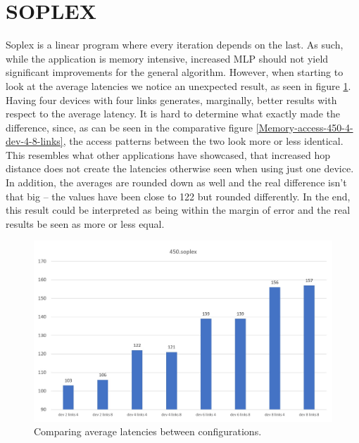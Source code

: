 \section{SOPLEX}
Soplex is a linear program where every iteration depends on the last. As such, while the application is memory intensive, increased MLP should not yield significant improvements for the general algorithm. However, when starting to look at the average latencies we notice an unexpected result, as seen in figure \ref{Memory-access-450-average-latency}. Having four devices with four links generates, marginally, better results with respect to the average latency. It is hard to determine what exactly made the difference, since, as can be seen in the comparative figure \ref{Memory-access-450-4-dev-4-8-links}, the access patterns between the two look more or less identical. This resembles what other applications have showcased, that increased hop distance does not create the latencies otherwise seen when using just one device. In addition, the averages are rounded down as well and the real difference isn't that big -- the values have been close to 122 but rounded differently. In the end, this result could be interpreted as being within the margin of error and the real results be seen as more or less equal.

\begin{figure}[!ht]
    \centering
    \includegraphics[width=1.0\linewidth]{figure/450-averages.jpg}
    \caption{Comparing average latencies between configurations.}
    \label{Memory-access-450-average-latency}
\end{figure}


